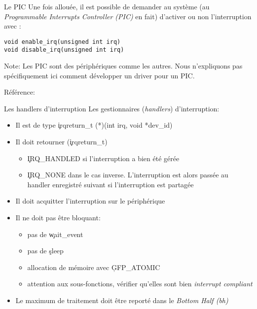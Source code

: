 \begin{frame}[fragile=singleslide]{Le PIC}
  Une  fois  allouée, il  est  possible  de  demander au  système  (au
  \emph{Programmable Interrupts  Controller (PIC)} en  fait) d'activer
  ou non l'interruption avec :
  \begin{lstlisting}
void enable_irq(unsigned int irq)
void disable_irq(unsigned int irq)
  \end{lstlisting}

  Note:  Les  PIC  sont  des  périphériques  comme  les  autres.  Nous
  n'expliquons  pas spécifiquement  ici comment  développer  un driver
  pour un PIC.

  Référence:  
\end{frame}

\begin{frame}[fragile=singleslide]{Les handlers d'interruption}
  Les gestionnaires (\emph{handlers})  d'interruption:
  \begin{itemize}
  \item Il est de type \c{irqreturn_t (*)(int irq, void *dev_id)}
  \item Il doit retourner (\c{irqreturn_t})
    \begin{itemize}
    \item  \c{IRQ_HANDLED} si l'interruption a bien été gérée
    \item \c{IRQ_NONE}  dans le cas inverse.  L'interruption est alors
      passée  au  handler  enregistré  suivant si  l'interruption  est
      partagée
    \end{itemize}
  \item Il doit acquitter l'interruption sur le périphérique
  \item Il ne doit pas être bloquant:
    \begin{itemize}
    \item pas de \c{wait_event}
    \item pas de \c{sleep}
    \item allocation de mémoire avec \c{GFP_ATOMIC}
    \item  attention aux sous-fonctions,  vérifier qu'elles  sont bien
      \emph{interrupt compliant}
    \end{itemize}
  \item  Le   maximum  de  traitement   doit  être  reporté   dans  le
    \emph{Bottom Half (bh)}
  \end{itemize}
\end{frame}

